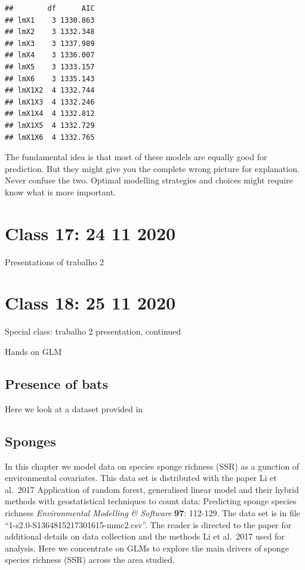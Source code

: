 \documentclass[
]{book}
\begin{document}
\begin{verbatim}
##        df      AIC
## lmX1    3 1330.863
## lmX2    3 1332.348
## lmX3    3 1337.989
## lmX4    3 1336.007
## lmX5    3 1333.157
## lmX6    3 1335.143
## lmX1X2  4 1332.744
## lmX1X3  4 1332.246
## lmX1X4  4 1332.812
## lmX1X5  4 1332.729
## lmX1X6  4 1332.765
\end{verbatim}

The fundamental idea is that most of these models are equally good for prediction. But they might give you the complete wrong picture for explanation. Never confuse the two. Optimal modelling strategies and choices might require know what is more important.

\hypertarget{aula17}{%
\chapter{Class 17: 24 11 2020}\label{aula17}}

Presentations of trabalho 2

\hypertarget{aula18}{%
\chapter{Class 18: 25 11 2020}\label{aula18}}

Special class: trabalho 2 presentation, continued

Hands on GLM

\hypertarget{presence-of-bats}{%
\section{Presence of bats}\label{presence-of-bats}}

Here we look at a dataset provided in

\hypertarget{sponges}{%
\section{Sponges}\label{sponges}}

In this chapter we model data on species sponge richness (SSR) as a gunction of environmental covariates. This data set is distributed with the paper Li et al.~2017 Application of random forest, generalised linear model and their hybrid methods with geostatistical techniques to count data: Predicting sponge species richness \emph{Environmental Modelling \& Software} \textbf{97}: 112-129. The data set is in file ``1-s2.0-S1364815217301615-mmc2.csv''. The reader is directed to the paper for additional details on data collection and the methods Li et al.~2017 used for analysis. Here we concentrate on GLMs to explore the main drivers of sponge species richness (SSR) across the area studied.
\end{document}
